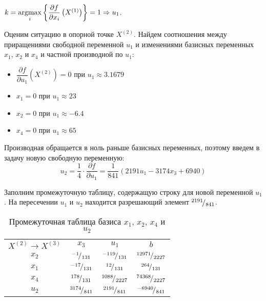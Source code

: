 $k = \operatorname*{argmax}\limits_i\left\{\dfrac{\partial f}{\partial x_i}\left(X^{(1)}\right)\right\} = 1 \Rightarrow u_1$.

Оценим ситуацию в опорной точке $X^{(2)}$. Найдем соотношения между приращениями свободной переменной $u_1$ и изменениями базисных переменных $x_1$, $x_2$ и $x_4$ и частной производной по $u_1$:
\begin{itemize}
	\item $\dfrac{\partial f}{\partial u_1}\left(X^{(2)}\right) = 0$ при $u_1 \approx 3.1679$
	\item $x_1 = 0$ при $u_1 \approx 23$
	\item $x_2 = 0$ при $u_1 \approx -6.4$
	\item $x_4 = 0$ при $u_1 \approx 65$
\end{itemize}

Производная обращается в ноль раньше базисных переменных, поэтому введем в задачу новую свободную переменную:
\begin{equation*}
	u_2 = \frac{1}{4} \cdot \frac{\partial f}{\partial u_1} = \frac{1}{841} (2191 u_1 - 3174 x_3 + 6940)
\end{equation*}

Заполним промежуточную таблицу, содержащую строку для новой переменной $u_1$. На пересечении $u_1$ и $u_2$ находится разрешающий элемент ${}^{2191}\!/_{841}$. 
\begin{table}[H]
\begin{center}
	\def\tabcolsep{25pt}
	\def\arraystretch{1.3}
	\caption{Промежуточная таблица базиса $x_1$, $x_2$, $x_4$ и $u_2$}
	\begin{tabular}{|c||c|c||c|}
		\hline
		$X^{(2)} \to X^{(3)}$ & $x_3$ & $u_1$ & $b$ \\ 
		\hhline{|=#==#=|}
		$x_2$ & ${}^{-1}\!/_{131}$ & ${}^{-119}\!/_{131}$ & ${}^{12971}\!/_{2227}$ \\ 
		\hline
		$x_1$ & ${}^{-17}\!/_{131}$ & ${}^{12}\!/_{131}$ & ${}^{264}\!/_{131}$ \\ 
		\hline
		$x_4$ & ${}^{178}\!/_{131}$ & ${}^{1088}\!/_{2227}$ & ${}^{74368}\!/_{2227}$ \\ 
		\hline
		$u_2$ & ${}^{3174}\!/_{841}$ & \textcolor{red}{\boldmath${}^{2191}\!/_{841}$} & ${}^{-6940}\!/_{841}$ \\ 
		\hline
	\end{tabular}
\end{center}
\end{table}

